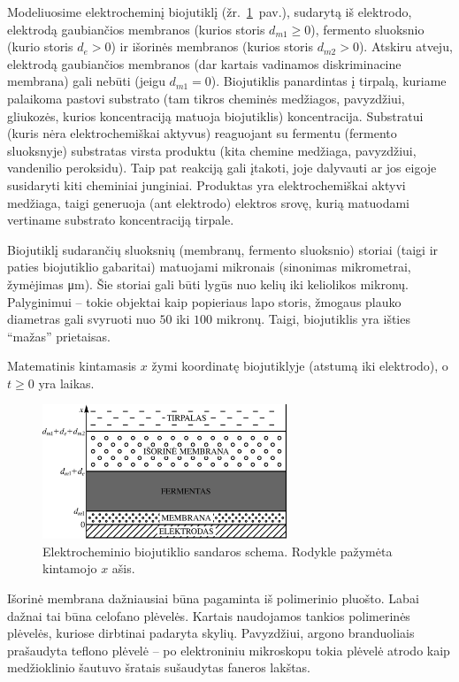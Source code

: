 \documentclass[a4paper,12pt]{article}
\begin{document}
Modeliuosime elektrocheminį biojutiklį (žr.\ \ref{pav01}~pav.), sudarytą iš elektrodo, elektrodą gaubiančios membranos (kurios storis $d_{m1}\geqslant 0$),
fermento sluoksnio (kurio storis $d_e > 0$) ir išorinės membranos (kurios storis $d_{m2} > 0$).
Atskiru atveju, elektrodą gaubiančios membranos (dar kartais vadinamos diskriminacine membrana) gali nebūti (jeigu $d_{m1} = 0$).
Biojutiklis panardintas į tirpalą, kuriame palaikoma pastovi substrato (tam tikros cheminės medžiagos, pavyzdžiui, gliukozės, kurios koncentraciją matuoja biojutiklis) koncentracija.
Substratui (kuris nėra elektrochemiškai aktyvus) reaguojant su fermentu (fermento sluoksnyje) substratas virsta produktu (kita chemine medžiaga, pavyzdžiui, vandenilio peroksidu).
Taip pat reakciją gali įtakoti, joje dalyvauti ar jos eigoje susidaryti kiti cheminiai junginiai.
Produktas yra elektrochemiškai aktyvi medžiaga, taigi generuoja (ant elektrodo) elektros srovę, kurią matuodami vertiname substrato koncentraciją tirpale.

Biojutiklį sudarančių sluoksnių (membranų, fermento sluoksnio) storiai (taigi ir paties biojutiklio gabaritai) matuojami mikronais
(sinonimas mikrometrai, žymėjimas \si{\micro\metre}).
Šie storiai gali būti lygūs nuo kelių iki keliolikos mikronų.
Palyginimui -- tokie objektai kaip popieriaus lapo storis, žmogaus plauko diametras gali svyruoti nuo $50$ iki $100$ mikronų.
Taigi, biojutiklis yra išties ``mažas'' prietaisas.

Matematinis kintamasis $x$ žymi koordinatę biojutiklyje (atstumą iki elektrodo), o $t\geqslant 0$ yra laikas.

\begin{figure}[ht!]
    \centering
    \includegraphics[clip=true, width=0.65\textwidth]{figures/fig01.pdf}
    \caption{Elektrocheminio biojutiklio sandaros schema. Rodykle pažymėta kintamojo $x$ ašis.}
    \label{pav01}
\end{figure}

Išorinė membrana dažniausiai būna pagaminta iš polimerinio pluošto.
Labai dažnai tai būna celofano plėvelės.
Kartais naudojamos tankios polimerinės plėvelės, kuriose dirbtinai padaryta skylių.
Pavyzdžiui, argono branduoliais prašaudyta teflono plėvelė -- po elektroniniu mikroskopu tokia plėvelė atrodo kaip medžioklinio šautuvo šratais sušaudytas faneros lakštas.
\end{document}
